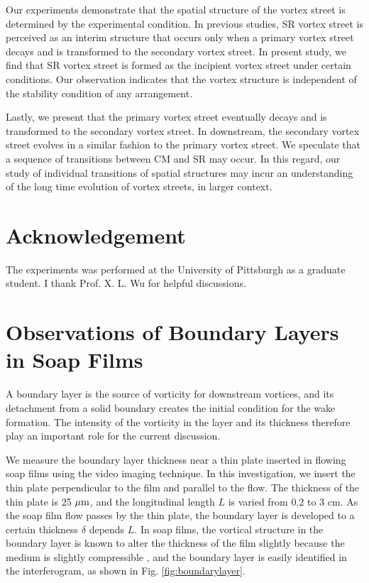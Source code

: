 \documentclass[english, aps, prl, longbibliography, preprint]{revtex4-1}
\newcommand\citepar\citep
\newcommand\micron{{\rm \mu m}}
\begin{document}
Our experiments demonstrate that the spatial structure of the vortex street is determined by the experimental condition.
In previous studies, SR vortex street is perceived as an interim structure that occurs only when a primary vortex street decays and is transformed to the secondary vortex street.
In present study, we find that SR vortex street is formed as the incipient vortex street under certain conditions.
Our observation indicates that the vortex structure is independent of the stability condition of any arrangement.

Lastly, we present that the primary vortex street eventually decays and is transformed to the secondary vortex street.
In downstream, the secondary vortex street evolves in a similar fashion to the primary vortex street. 
We speculate that a sequence of transitions between CM and SR may occur.
In this regard, our study of individual transitions of spatial structures may incur an understanding of the long time evolution of vortex streets, in larger context.



\section*{Acknowledgement}

The experiments was performed at the University of Pittsburgh as a graduate student.
I thank Prof. X. L. Wu for helpful discussions.



\appendix

\section{Observations of Boundary Layers in Soap Films}

A boundary layer is the source of vorticity for downstream vortices, and its detachment from a solid boundary creates the initial condition for the wake formation.
The intensity of the vorticity in the layer and its thickness therefore play an important role for the current discussion.

We measure the boundary layer thickness near a thin plate inserted in flowing soap films using the video imaging technique.
In this investigation, we insert the thin plate perpendicular to the film and parallel to the flow.
The thickness of the thin plate is 25 $\micron$, and the longitudinal length $L$ is varied from 0.2 to 3 cm.
As the soap film flow passes by the thin plate, the boundary layer is developed to a certain thickness $\delta$ depends $L$.
In soap films, the vortical structure in the boundary layer is known to alter the thickness of the film slightly \citepar{Rivera:1998tw, Wu-prl-95} because the medium is slightly compressible \citepar{Kim:2017dn}, and the boundary layer is easily identified in the interferogram, as shown in Fig. \ref{fig:boundarylayer}.
\end{document}
